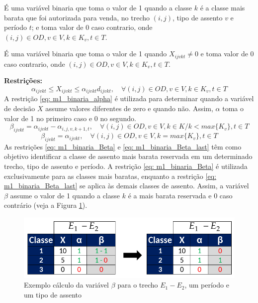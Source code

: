 \begin{description}[style=unboxed, leftmargin=2.5cm, labelindent=1.5cm]
	\setlength{\itemsep}{-2.2em} %
	\setlength{\parskip}{0em} %
	\item[$\beta_{ijvkt}:$] É uma variável binaria que toma o valor de 1 quando a classe $k$ é a classe mais barata que foi autorizada para venda, no trecho $(i,j)$, tipo de assento $v$ e período $t$; e toma  valor de 0 caso contrario, onde $(i,j) \in OD, v \in V, k \in K_v, t \in T$.  \\
	\item[$\alpha_{ijvkt}:$] É uma variável binaria que toma o valor de 1 quando $X_{ijvkt} \neq 0$ e toma  valor de 0 caso contrario, onde $(i,j) \in OD, v \in V, k \in K_v, t \in T$.
\end{description}
\textbf{Restrições:}
\begin{equation}
	\alpha_{ijvkt} \leq X_{ijvkt} \leq \alpha_{ijvkt}d_{ijvkt}, \quad   \forall(i,j) \in OD, v \in V, k \in K_v, t \in T   \label{eq: m1_binaria_alpha}
\end{equation}
A restrição  \eqref{eq: m1_binaria_alpha} é utilizada para determinar quando a variável de decisão $X$ assume valores diferentes de zero e quando não. Assim, $\alpha$ toma o valor de 1 no primeiro caso e 0 no segundo.
\begin{equation}
	\beta_{ijvkt} = \alpha_{ijvkt} - \alpha_{i,j,v,k+1,t}, \quad \forall (i,j) \in OD, v \in V, k \in K /k < max\{K_v\}, t\in T    \label{eq: m1_binaria_Beta}
\end{equation}
\begin{equation}
	\beta_{ijvkt} = \alpha_{ijvkt}, \quad   \forall(i,j) \in OD, v \in V, k = max\{K_v\}, t \in T    \label{eq: m1_binaria_Beta_last}
\end{equation}
As restrições \eqref{eq: m1_binaria_Beta} e \eqref{eq: m1_binaria_Beta_last} têm como objetivo identificar a classe de assento mais barata reservada em um determinado trecho, tipo de assento e período. A restrição \eqref{eq: m1_binaria_Beta} é utilizada exclusivamente para as classes mais baratas, enquanto a restrição \eqref{eq: m1_binaria_Beta_last} se aplica às demais classes de assento. Assim, a variável $\beta$ assume o valor de 1 quando a classe $k$ é a mais barata reservada e 0 caso contrário (veja a Figura \ref{fig: betha}).
\begin{figure}[H]
	\begin{center}
		\includegraphics[scale=0.45]{img/betha.png}
		\caption{Exemplo cálculo da variável $\beta$ para o trecho $E_1 - E_2$, um período e um tipo de assento}
		\label{fig: betha}
	\end{center}
\end{figure}
